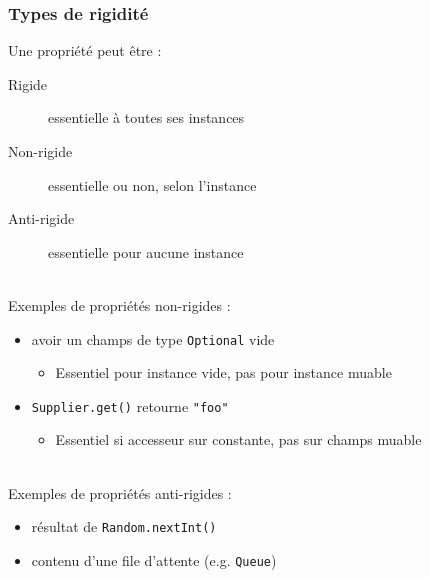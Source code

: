 \documentclass[draft]{beamer}
\begin{document}
\begin{frame}
\frametitle{Types de rigidité}
Une propriété peut être :
\begin{description}
 \item[Rigide] essentielle à toutes ses instances
 \item[Non-rigide] essentielle ou non, selon l'instance
 \item[Anti-rigide] essentielle pour aucune instance
\end{description}
~\\
Exemples de propriétés non-rigides :
\begin{itemize}
 \item avoir un champs de type \lstinline{Optional} vide
 \begin{itemize}
  \item Essentiel pour instance vide, pas pour instance muable
 \end{itemize}
 \item \lstinline{Supplier.get()} retourne \lstinline{"foo"}
 \begin{itemize}
  \item Essentiel si accesseur sur constante, pas sur champs muable
 \end{itemize}
\end{itemize}
~\\
Exemples de propriétés anti-rigides :
\begin{itemize}
 \item résultat de \lstinline{Random.nextInt()}
 \item contenu d'une file d'attente (e.g. \lstinline{Queue})
\end{itemize}
\end{frame}
\end{document}
